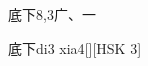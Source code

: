 \begin{entry}{底下}{8,3}{⼴、⼀}
  \begin{phonetics}{底下}{di3 xia4}[][HSK 3]
  \end{phonetics}
\end{entry}
